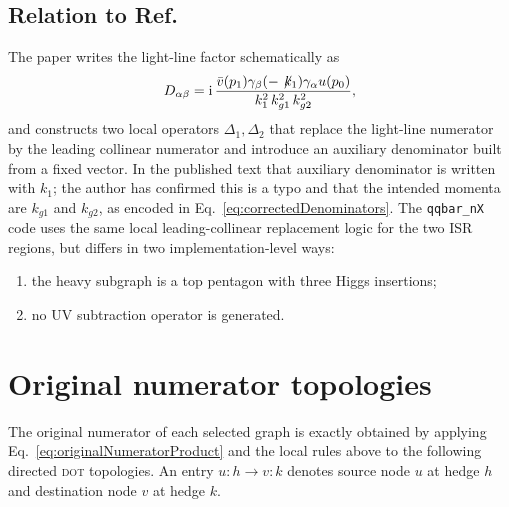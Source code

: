 \documentclass[11pt]{article}
\newcommand{\ii}{\mathrm{i}}
\newcommand{\qqbarNX}{\texttt{qqbar\_nX}}
\newcommand{\DOT}{\textsc{dot}}
\newcommand{\Slash}[1]{\not\!#1}
\begin{document}
\subsection[Relation to reference subtraction formula]{Relation to Ref.~\cite{KermanschahVicini2026}}

The paper writes the light-line factor schematically as
\[
  D_{\alpha\beta}
  =
  \ii\,
  \frac{
    \bar v(p_1)\gamma_\beta(-\Slash{k}_1)\gamma_\alpha u(p_0)
  }{
    k_1^2\,k_{g1}^2\,k_{g2}^2
  },
\]
and constructs two local operators \(\Delta_1,\Delta_2\) that replace the
light-line numerator by the leading collinear numerator and introduce an
auxiliary denominator built from a fixed vector.  In the published text that
auxiliary denominator is written with \(k_1\); the author has confirmed this is
a typo and that the intended momenta are \(k_{g1}\) and \(k_{g2}\), as encoded
in Eq.~\eqref{eq:correctedDenominators}.  The \qqbarNX{} code uses the same
local leading-collinear replacement logic for the two ISR regions, but differs
in two implementation-level ways:
\begin{enumerate}[leftmargin=2em]
  \item the heavy subgraph is a top pentagon with three Higgs insertions;
  \item no UV subtraction operator is generated.
\end{enumerate}

\section{Original numerator topologies}
\label{sec:numeratorTopologies}

The original numerator of each selected graph is exactly obtained by applying
Eq.~\eqref{eq:originalNumeratorProduct} and the local rules above to the
following directed \DOT{} topologies.  An entry \(u:h\to v:k\) denotes source
node \(u\) at hedge \(h\) and destination node \(v\) at hedge \(k\).
\end{document}
